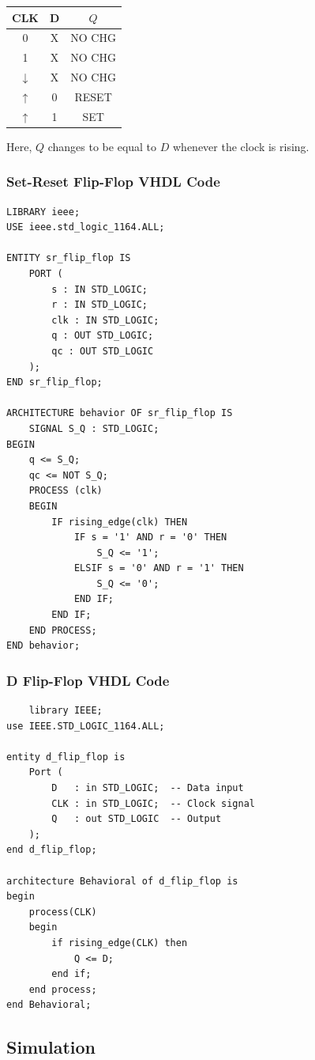 \documentclass[12pt]{article}
\begin{document}
\begin{center}
    \renewcommand{\arraystretch}{1.5}
    \begin{tabular}{|c|c|c|}
        \hline
        CLK & D & \(Q\) \\ 
        \hline
        0 & X & NO CHG  \\ 
        1 & X & NO CHG  \\ 
        \(\downarrow\) & X & NO CHG \\ 
        \(\uparrow\) & 0 & RESET  \\ 
        \(\uparrow\) & 1 & SET  \\ 
        \hline
    \end{tabular}
\end{center}
Here, \(Q\) changes to be equal to \(D\) whenever the clock is rising.
\subsubsection{Set-Reset Flip-Flop VHDL Code}
\begin{verbatim}
LIBRARY ieee;
USE ieee.std_logic_1164.ALL;

ENTITY sr_flip_flop IS
	PORT (
		s : IN STD_LOGIC;
		r : IN STD_LOGIC;
		clk : IN STD_LOGIC;
		q : OUT STD_LOGIC;
		qc : OUT STD_LOGIC
	);
END sr_flip_flop;

ARCHITECTURE behavior OF sr_flip_flop IS
	SIGNAL S_Q : STD_LOGIC;
BEGIN
	q <= S_Q;
	qc <= NOT S_Q;
	PROCESS (clk)
	BEGIN
		IF rising_edge(clk) THEN
			IF s = '1' AND r = '0' THEN
				S_Q <= '1';
			ELSIF s = '0' AND r = '1' THEN
				S_Q <= '0';
			END IF;
		END IF;
	END PROCESS;
END behavior;
\end{verbatim}

\subsubsection{D Flip-Flop VHDL Code}
\begin{verbatim}
    library IEEE;
use IEEE.STD_LOGIC_1164.ALL;

entity d_flip_flop is
    Port (
        D   : in STD_LOGIC;  -- Data input
        CLK : in STD_LOGIC;  -- Clock signal
        Q   : out STD_LOGIC  -- Output
    );
end d_flip_flop;

architecture Behavioral of d_flip_flop is
begin
    process(CLK)
    begin
        if rising_edge(CLK) then
            Q <= D;
        end if;
    end process;
end Behavioral;
\end{verbatim}
\subsection{Simulation}
\end{document}
